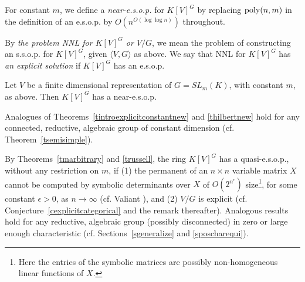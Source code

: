 \documentclass[11pt]{article}
\begin{document}
For constant $m$,  we define a {\em  near-e.s.o.p.} 
for $K[V]^G$ by replacing ${\mbox {poly}}(n,m)$ in the definition of an e.s.o.p. 
by $O(n^{O(\log \log n)})$ throughout. 


By {\em the problem NNL for $K[V]^G$ or $V/G$}, we mean  the problem of constructing an s.s.o.p. for $K[V]^G$,
given  $\langle V, G\rangle$ as above.
We say that  NNL for $K[V]^G$ has {\em an explicit solution} if $K[V]^G$ has an e.s.o.p.



\begin{theorem} \label{thilbertnew}
Let  $V$  be  a finite dimensional representation of $G=SL_m(K)$, with constant $m$, as above.
Then $K[V]^G$ has a near-e.s.o.p. 
\end{theorem} 

Analogues of Theorems~\ref{tintroexplicitconstantnew} and \ref{thilbertnew} hold for  any connected, reductive,
algebraic group of constant dimension (cf. Theorem~\ref{tsemisimple}). 


By Theorems~\ref{tmarbitrary} and \ref{trussell},
the ring $K[V]^G$ has a quasi-e.s.o.p.,  without  any restriction on $m$,
if (1) the permanent of an $n \times n$ variable matrix $X$
cannot be computed  by symbolic determinants over $X$   of 
$O(2^{n^\epsilon})$ size\footnote{Here the entries of the
symbolic matrices are possibly  non-homogeneous linear functions of $X$.},
for some constant $\epsilon >0$, as $n\rightarrow \infty$ (cf. Valiant \cite{valiant2}), 
and (2) $V/G$ is explicit (cf. Conjecture~\ref{cexplicitcategorical} and the
remark thereafter).
Analogous results  hold for any reductive, algebraic group (possibly disconnected)
in zero or large enough characteristic (cf. Sections~\ref{sgeneralize} and \ref{sposcharequi}).
\end{document}
